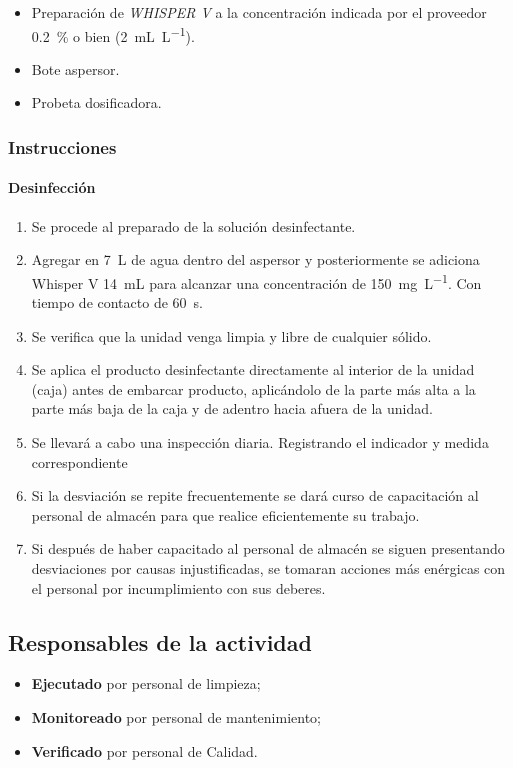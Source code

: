 \begin{itemize}
	\item Preparación de \emph{WHISPER V} a la concentración indicada por el proveedor \qty{0.2}{\percent} o bien (\qty{2}{\milli\liter\per\liter}).
	\item Bote aspersor.
	\item Probeta dosificadora.
\end{itemize}

\subsubsection{Instrucciones}
\paragraph{Desinfección}
\begin{enumerate}
	\item Se procede al preparado de la solución desinfectante.
	\item Agregar en \qty{7}{\liter} de agua dentro del aspersor y posteriormente se adiciona Whisper V \qty{14}{\milli\liter} para alcanzar una concentración de \qty{150}{\milli\gram\per\liter}. Con tiempo de contacto de \qty{60}{\second}.
	\item Se verifica que la unidad venga limpia y libre de cualquier sólido.
	\item Se aplica el producto desinfectante directamente al interior de la unidad (caja) antes de embarcar producto, aplicándolo de la parte más alta a la parte más baja de la caja y de adentro hacia afuera de la unidad.
	\item Se llevará a cabo una inspección diaria. Registrando el indicador y medida correspondiente
	\item Si la desviación se repite frecuentemente se dará curso de capacitación al personal de almacén para que realice eficientemente su trabajo.
	\item Si después de haber capacitado al personal de almacén se siguen presentando desviaciones por causas injustificadas, se tomaran acciones más enérgicas con el personal por incumplimiento con sus deberes.
\end{enumerate}

\subsection{Responsables de la actividad}
\begin{itemize}
	\item \textbf{Ejecutado} por personal de limpieza;
	\item \textbf{Monitoreado} por personal de mantenimiento;
	\item \textbf{Verificado} por personal de Calidad.
\end{itemize}

